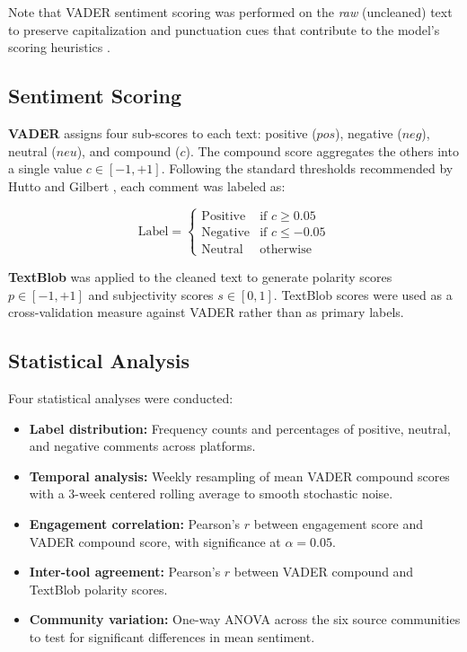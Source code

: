 \documentclass[conference]{IEEEtran}
\begin{document}
Note that VADER sentiment scoring was performed on the \emph{raw} (uncleaned)
text to preserve capitalization and punctuation cues that contribute to the
model's scoring heuristics \cite{hutto2014vader}.

\subsection{Sentiment Scoring}

\textbf{VADER} assigns four sub-scores to each text: positive ($pos$),
negative ($neg$), neutral ($neu$), and compound ($c$). The compound score
aggregates the others into a single value $c \in [-1, +1]$. Following the
standard thresholds recommended by Hutto and Gilbert \cite{hutto2014vader},
each comment was labeled as:

\begin{equation}
\text{Label} =
\begin{cases}
\text{Positive} & \text{if } c \geq 0.05 \\
\text{Negative} & \text{if } c \leq -0.05 \\
\text{Neutral}  & \text{otherwise}
\end{cases}
\end{equation}

\textbf{TextBlob} \cite{loria2018textblob} was applied to the cleaned text
to generate polarity scores $p \in [-1, +1]$ and subjectivity scores
$s \in [0, 1]$. TextBlob scores were used as a cross-validation measure
against VADER rather than as primary labels.

\subsection{Statistical Analysis}

Four statistical analyses were conducted:
\begin{itemize}
  \item \textbf{Label distribution:} Frequency counts and percentages of
        positive, neutral, and negative comments across platforms.
  \item \textbf{Temporal analysis:} Weekly resampling of mean VADER compound
        scores with a 3-week centered rolling average to smooth stochastic
        noise.
  \item \textbf{Engagement correlation:} Pearson's $r$ between engagement
        score and VADER compound score, with significance at $\alpha = 0.05$.
  \item \textbf{Inter-tool agreement:} Pearson's $r$ between VADER compound
        and TextBlob polarity scores.
  \item \textbf{Community variation:} One-way ANOVA across the six source
        communities to test for significant differences in mean sentiment.
\end{itemize}
\end{document}
